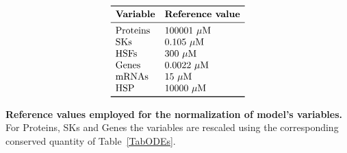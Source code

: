 \documentclass[oneside, 10pt, a4paper, twocolumn]{article}
\begin{document}
\begin{table}[h!]
\[\begin{array}{ll}
\toprule
    \text{\textbf{Variable}} & \text{\textbf{Reference value}}\\
\midrule
    \text{Proteins} & 100001 \text{ $\mu$M} \\
    \text{SKs}      & 0.105 \text{ $\mu$M}  \\
    \text{HSFs}     & 300 \text{ $\mu$M}    \\
    \text{Genes}    & 0.0022 \text{ $\mu$M} \\
    \text{mRNAs}    & 15 \text{ $\mu$M}     \\
    \text{HSP}      & 10000 \text{ $\mu$M}  \\
\bottomrule
\end{array}\]
\caption{ \textbf{Reference values employed for the normalization of model's variables.} For Proteins, SKs and Genes the variables are rescaled using the corresponding conserved quantity of Table~\ref{TabODEs}.}\label{TabRefVal}
\end{table}
\end{document}
